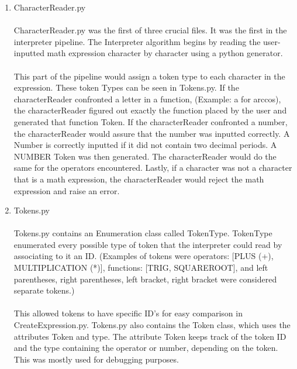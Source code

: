         \begin{enumerate}
            \item CharacterReader.py
            \paragraph{}
            CharacterReader.py was the first of three crucial files. It was the first in the interpreter pipeline. The Interpreter algorithm begins by reading the user-inputted math expression character by character using a python generator.

            \paragraph{}
            This part of the pipeline would assign a token type to each character in the expression. These token Types can be seen in Tokens.py. If the characterReader confronted a letter in a function, (Example: a for arccos), the characterReader figured out exactly the function placed by the user and generated that function Token. If the characterReader confronted a number, the characterReader would assure that the number was inputted correctly. A Number is correctly inputted if it did not contain two decimal periods. A NUMBER Token was then generated. The characterReader would do the same for the operators encountered. Lastly, if a character was not a character that is a math expression, the characterReader would reject the math expression and raise an error.

            \item Tokens.py
            \paragraph{}
            Tokens.py contains an Enumeration class called TokenType. TokenType enumerated every possible type of token that the interpreter could read by associating to it an ID. (Examples of tokens were operators: [PLUS (+), MULTIPLICATION (*)], functions: [TRIG, SQUAREROOT], and left parentheses, right parentheses, left bracket, right bracket were considered separate tokens.)

            \paragraph{}
            This allowed tokens to have specific ID’s for easy comparison in CreateExpression.py. Tokens.py also contains the Token class, which uses the attributes Token and type. The attribute Token keeps track of the token ID and the type containing the operator or number, depending on the token. This was mostly used for debugging purposes.



\end{enumerate}
